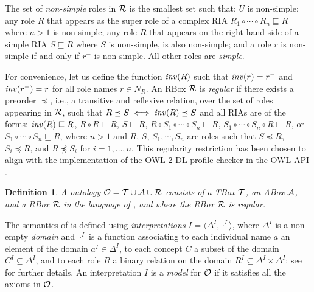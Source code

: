 \documentclass[
]{ceurart}
\newtheorem{definition}{Definition}
\begin{document}
The set of \emph{non-simple} roles in $\mathcal{R}$ is the smallest set such that: $U$ is non-simple; any role $R$ that appears as the super role of a complex RIA $R_1 \circ \cdots \circ R_n \sqsubseteq R$ where $n > 1$ is non-simple; any role $R$ that appears on the right-hand side of a simple RIA $S \sqsubseteq R$ where $S$ is non-simple, is also non-simple; and a role $r$ is non-simple if and only if $r^-$ is non-simple.
All other roles are \emph{simple}.

For convenience, let us define the function $\mathit{inv}(R)$ such that $\mathit{inv}(r) = r^-$ and $\mathit{inv}(r^-) = r$ for all role names $r \in N_R$. 
%
An RBox $\mathcal{R}$ is  \emph{regular} if there exists a preorder $\preceq$, i.e., a transitive and reflexive relation, over the set of roles appearing in $\mathcal{R}$, such that $R \preceq S \iff \mathit{inv}(R) \preceq S$ and all RIAs are of the forms:
$\mathit{inv}(R) \sqsubseteq R$,
$R \circ R \sqsubseteq R$,
$S \sqsubseteq R$, $R \circ S_1 \circ \cdots \circ S_n \sqsubseteq R$,
$S_1 \circ \cdots \circ S_n \circ R \sqsubseteq R$, or
$S_1 \circ \cdots \circ S_n \sqsubseteq R$,
where $n > 1$ and $R$, $S$, $S_1, \cdots, S_n$ are roles such that $S \preceq R$, $S_i \preceq R$, and $R \not\preceq S_i$ for $i = 1, \dots, n$. This regularity restriction has been chosen to align with the implementation of the OWL 2 DL \cite{motik2012ontology} profile checker in the OWL API \cite{horridge2011owl}. 

\begin{definition}
A \SROIQ  ontology $\mathcal{O} = \mathcal{T} \cup \mathcal{A} \cup \mathcal{R}$ consists of a TBox $\mathcal{T}$, an ABox $\mathcal{A}$, and a RBox $\mathcal{R}$ in the language of \SROIQ, and where the RBox $\mathcal{R}$ is regular.
\end{definition}

The semantics of \SROIQ is  defined using \emph{interpretations} $I = \langle \Delta^I, \cdot^I \rangle$, where $\Delta^I$ is a non-empty \emph{domain} and $\cdot^I$ is a function associating to each individual name $a$ an element of the domain $a^I \in \Delta^I$, to each concept $C$ a subset of the domain $C^I \subseteq \Delta^I$, and to each role $R$ a binary relation on the domain $R^I \subseteq \Delta^I \times \Delta^I$; see \cite{baader_horrocks_lutz_sattler_2017,HorrocksKutzSattlerKR2006} for further details. An interpretation $I$ is a \emph{model} for $\mathcal{O}$ if it satisfies all the axioms in $\mathcal{O}$.
\end{document}
